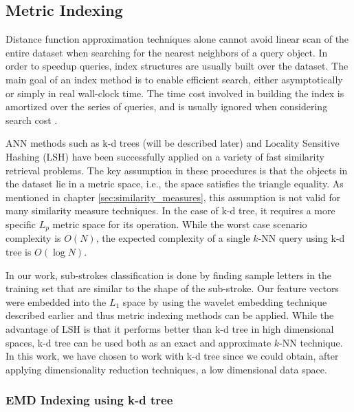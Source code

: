 \documentclass[10pt, conference, compsocconf]{IEEEtran}
\theoremstyle{definition}
\begin{document}
\subsection{Metric Indexing}
\label{subsec:metric_indexing}

\iftoggle{edit-mode}{\hspace{0pt}\marginpar{Motivation}}{}
Distance function approximation techniques alone cannot avoid linear scan of the entire dataset when searching for the nearest neighbors of a query object. 
In order to speedup queries, index structures are usually built over the dataset. 
The main goal of an index method is to enable efficient search, either asymptotically or simply in real wall-clock time. The time cost involved in building the index is amortized over the series of queries, and is usually ignored when considering search cost \cite{hetland2009basic}.

ANN methods such as k-d trees (will be described later) and Locality Sensitive Hashing (LSH) \cite{gionis1999similarity} have been successfully applied on a variety of fast similarity retrieval problems. 
The key assumption in these procedures is that the objects in the dataset lie in a metric space, i.e., the space satisfies the triangle equality. 
As mentioned in chapter \ref{sec:similarity_measures}, this assumption is not valid for many similarity measure techniques. 
In the case of k-d tree, it requires a more specific $L_p$ metric space for its operation.
While the worst case scenario complexity is $O(N)$, the expected complexity of a single $k$-NN query using k-d tree is $O(\log N)$.

In our work, sub-strokes classification is done by finding sample letters in the training set that are similar to the shape of the sub-stroke. 
Our feature vectors were embedded into the $L_1$ space by using the wavelet embedding technique described earlier and thus metric indexing methods can be applied. 
While the advantage of LSH is that it performs better than k-d tree in high dimensional spaces, k-d tree can be used both as an exact and approximate $k$-NN technique. 
In this work, we have chosen to work with k-d tree since we could obtain, after applying dimensionality reduction techniques, a low dimensional data space.

\subsubsection{EMD Indexing using k-d tree}
\label{subsubsec:kd_tree}
\end{document}
